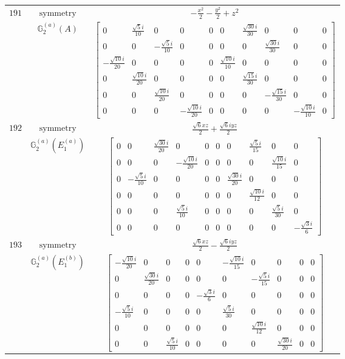 \documentclass[fleqn,8pt,landscape]{jsarticle}
\begin{document}
\begin{longtable}{ccc}
$ 191 $ & $ \text{symmetry} $ & $ - \frac{x^{2}}{2} - \frac{y^{2}}{2} + z^{2} $ \\
$  $ & $ \mathbb{G}_{2}^{(a)}(A) $ & $ \begin{bmatrix} 0 & \frac{\sqrt{5} i}{10} & 0 & 0 & 0 & 0 & \frac{\sqrt{30} i}{30} & 0 & 0 & 0 \\ 0 & 0 & - \frac{\sqrt{5} i}{10} & 0 & 0 & 0 & 0 & \frac{\sqrt{30} i}{30} & 0 & 0 \\ - \frac{\sqrt{10} i}{20} & 0 & 0 & 0 & 0 & \frac{\sqrt{10} i}{10} & 0 & 0 & 0 & 0 \\ 0 & \frac{\sqrt{10} i}{20} & 0 & 0 & 0 & 0 & \frac{\sqrt{15} i}{30} & 0 & 0 & 0 \\ 0 & 0 & \frac{\sqrt{10} i}{20} & 0 & 0 & 0 & 0 & - \frac{\sqrt{15} i}{30} & 0 & 0 \\ 0 & 0 & 0 & - \frac{\sqrt{10} i}{20} & 0 & 0 & 0 & 0 & - \frac{\sqrt{10} i}{10} & 0 \end{bmatrix} $ \\ \hline
$ 192 $ & $ \text{symmetry} $ & $ \frac{\sqrt{6} x z}{2} + \frac{\sqrt{6} i y z}{2} $ \\
$  $ & $ \mathbb{G}_{2}^{(a)}(E_{1}^{(a)}) $ & $ \begin{bmatrix} 0 & 0 & \frac{\sqrt{30} i}{20} & 0 & 0 & 0 & 0 & \frac{\sqrt{5} i}{15} & 0 & 0 \\ 0 & 0 & 0 & - \frac{\sqrt{10} i}{20} & 0 & 0 & 0 & 0 & \frac{\sqrt{10} i}{15} & 0 \\ 0 & - \frac{\sqrt{5} i}{10} & 0 & 0 & 0 & 0 & \frac{\sqrt{30} i}{20} & 0 & 0 & 0 \\ 0 & 0 & 0 & 0 & 0 & 0 & 0 & \frac{\sqrt{10} i}{12} & 0 & 0 \\ 0 & 0 & 0 & \frac{\sqrt{5} i}{10} & 0 & 0 & 0 & 0 & \frac{\sqrt{5} i}{30} & 0 \\ 0 & 0 & 0 & 0 & 0 & 0 & 0 & 0 & 0 & - \frac{\sqrt{3} i}{6} \end{bmatrix} $ \\ \hline
$ 193 $ & $ \text{symmetry} $ & $ \frac{\sqrt{6} x z}{2} - \frac{\sqrt{6} i y z}{2} $ \\
$  $ & $ \mathbb{G}_{2}^{(a)}(E_{1}^{(b)}) $ & $ \begin{bmatrix} - \frac{\sqrt{10} i}{20} & 0 & 0 & 0 & 0 & - \frac{\sqrt{10} i}{15} & 0 & 0 & 0 & 0 \\ 0 & \frac{\sqrt{30} i}{20} & 0 & 0 & 0 & 0 & - \frac{\sqrt{5} i}{15} & 0 & 0 & 0 \\ 0 & 0 & 0 & 0 & - \frac{\sqrt{3} i}{6} & 0 & 0 & 0 & 0 & 0 \\ - \frac{\sqrt{5} i}{10} & 0 & 0 & 0 & 0 & \frac{\sqrt{5} i}{30} & 0 & 0 & 0 & 0 \\ 0 & 0 & 0 & 0 & 0 & 0 & \frac{\sqrt{10} i}{12} & 0 & 0 & 0 \\ 0 & 0 & \frac{\sqrt{5} i}{10} & 0 & 0 & 0 & 0 & \frac{\sqrt{30} i}{20} & 0 & 0 \end{bmatrix} $ \\ \hline

\end{longtable}
\end{document}

